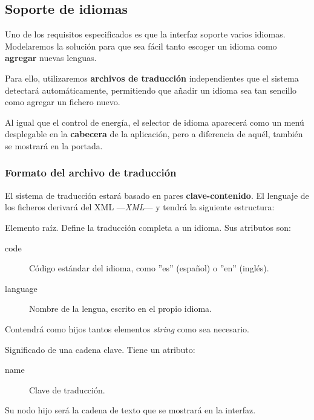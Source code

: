 \smallskip

\subsection{Soporte de idiomas}
\label{subsec:idiomas}

Uno de los requisitos especificados es que la interfaz soporte varios idiomas. Modelaremos la solución para que sea fácil tanto escoger un idioma como \textbf{agregar} nuevas lenguas.

Para ello, utilizaremos \textbf{archivos de traducción} independientes que el sistema detectará automáticamente, permitiendo que añadir un idioma sea tan sencillo como agregar un fichero nuevo.

Al igual que el control de energía, el selector de idioma aparecerá como un menú desplegable en la \textbf{cabecera} de la aplicación, pero a diferencia de aquél, también se mostrará en la portada.

\subsubsection{Formato del archivo de traducción}

El sistema de traducción estará basado en pares \textbf{clave-contenido}. El lenguaje de los ficheros derivará del \acrshort{XML} ---\textit{\acrlong{XML}}--- y tendrá la siguiente estructura:

\begin{description}[style=nextline]
	\item[translation]
	Elemento raíz. Define la traducción completa a un idioma. Sus atributos son:
	
	\begin{description}
		\item[code] Código estándar del idioma, como ''es'' (español) o ''en'' (inglés).
		\item[language] Nombre de la lengua, escrito en el propio idioma.
	\end{description}
	
	Contendrá como hijos tantos elementos \textit{string} como sea necesario.
	
	\item[string]
	Significado de una cadena clave. Tiene un atributo:
	
	\begin{description}
		\item[name] Clave de traducción.
	\end{description}
	
	Su nodo hijo será la cadena de texto que se mostrará en la interfaz.
\end{description}

